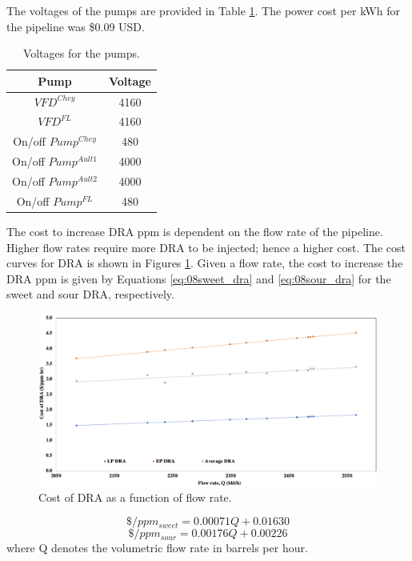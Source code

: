 The voltages of the pumps are provided in Table \ref{tab:08Voltages}.  The power cost per kWh for the pipeline was \$0.09 USD.
\begin{table}[h]
    \centering
    {
    \begin{tabular}{c|c}
        Pump          &  Voltage \\
        \hline
        $VFD^{Chey}$    &  4160    \\
        $VFD^{FL}$      &  4160    \\
        On/off $Pump^{Chey}$    & 480   \\
        On/off $Pump^{Ault1}$   & 4000  \\
        On/off $Pump^{Ault2}$   & 4000  \\
        On/off $Pump^{FL}$      & 480   \\
    \end{tabular}}
    \caption{Voltages for the pumps.}
    \label{tab:08Voltages}
\end{table}

The cost to increase DRA ppm is dependent on the flow rate of the pipeline. Higher flow rates require more DRA to be injected; hence a higher cost.  The cost curves for DRA is shown in Figures \ref{fig:08DRA_Cost}.  Given a flow rate, the cost to increase the DRA ppm is given by Equations \ref{eq:08sweet_dra} and \ref{eq:08sour_dra} for the sweet and sour DRA, respectively.

\begin{figure}[h]
    \centering
    \includegraphics[width=\textwidth]{images/08DRA_Cost.png}
    \caption{Cost of DRA as a function of flow rate.}
    \label{fig:08DRA_Cost}
\end{figure}

\begin{equation}
    \$ / ppm_{sweet} = 0.00071Q + 0.01630
    \label{eq:08sweet_dra}
\end{equation}
\begin{equation}
    \$ / ppm_{sour} = 0.00176Q + 0.00226
    \label{eq:08sour_dra}
\end{equation}
where Q denotes the volumetric flow rate in barrels per hour.

